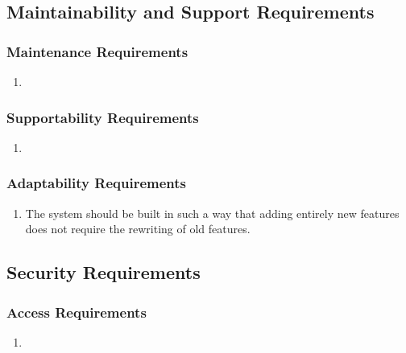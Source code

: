 \documentclass[english]{article}
\begin{document}

\subsection{Maintainability and Support Requirements}
\label{sub:maintainability_and_support_requirements}

\subsubsection{Maintenance Requirements}
\label{ssub:maintenance_requirements}
\begin{enumerate}[{MR}1. ]
	\item 
\end{enumerate}

\subsubsection{Supportability Requirements}
\label{ssub:supportability_requirements}
\begin{enumerate}[{MSR}1. ]
	\item 
\end{enumerate}

\subsubsection{Adaptability Requirements}
\label{ssub:adaptability_requirements}
\begin{enumerate}[{MAR}1. ]
	\item The system should be built in such a way that adding entirely new features does not require the rewriting of old features. 
\end{enumerate}


\subsection{Security Requirements}
\label{sub:security_requirements}

\subsubsection{Access Requirements}
\label{ssub:access_requirements}
\begin{enumerate}[{SAR}1. ]
	\item 
\end{enumerate}
\end{document}
